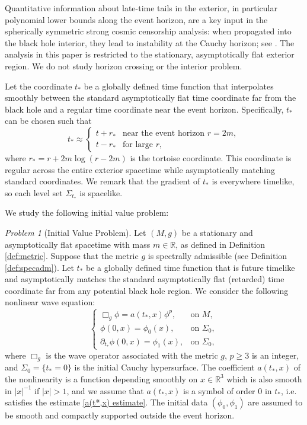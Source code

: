 \documentclass[10pt,a4paper,reqno]{amsart}
\newcommand{\RR}{\mathbb{R}}
\theoremstyle{definition}
\theoremstyle{remark}
\newtheorem{problem}[theorem]{Problem}
\numberwithin{equation}{section}
\newcommand{\R}{\mathbb R}
\newcommand{\ts}{t_*}
\begin{document}
Quantitative information about late-time tails in the exterior, in particular polynomial lower bounds along the event horizon, are a key input in the spherically symmetric strong cosmic censorship analysis: when propagated into the black hole interior, they lead to instability at the Cauchy horizon; see \cite{Luk2019a,Luk2019b}. The analysis in this paper is restricted to the stationary, asymptotically flat exterior region. We do not study horizon crossing or the interior problem.

Let the coordinate $t_*$ be a globally defined time function that interpolates smoothly between the standard asymptotically flat time coordinate far from the black hole and a regular time coordinate near the event horizon. Specifically, $t_*$ can be chosen such that
\[
t_* \approx 
\begin{cases}
t + r_* & \text{near the event horizon } r = 2m, \\
t - r_* & \text{for large } r,
\end{cases}
\]
where $r_* = r + 2m \log(r - 2m)$ is the tortoise coordinate. This coordinate is regular across the entire exterior spacetime while asymptotically matching standard coordinates. We remark that the gradient of $t_*$ is everywhere timelike, so each level set $\Sigma_{t_*}$ is spacelike.

\medskip

We study the following initial value problem:

\begin{problem}[Initial Value Problem]
Let $(M, g)$ be a stationary and asymptotically flat spacetime with mass $m \in \R$, as defined in Definition \ref{def:metric}. Suppose that the metric $g$ is spectrally admissible (see Definition \ref{def:specadm}). Let $t_*$ be a globally defined time function that is future timelike and asymptotically matches the standard asymptotically flat (retarded) time coordinate far from any potential black hole region. We consider the following nonlinear wave equation:
\begin{equation}
\label{IVP intro}
\begin{cases}
\Box_g \phi = a(t_*,x) \phi^p, & \text{on } M, \\
\phi(0, x) = \phi_0(x), & \text{on } \Sigma_0, \\
\partial_{t_*}\phi(0, x) = \phi_1(x), & \text{on } \Sigma_0,
\end{cases}
\end{equation}
where $\Box_g$ is the wave operator associated with the metric $g$, $p \geq 3$ is an integer, and $\Sigma_0 = \{t_* = 0\}$ is the initial Cauchy hypersurface. The coefficient $a(\ts,x)$ of the nonlinearity is a function depending smoothly on $x\in \RR^3$ which is also smooth in $|x|^{-1}$ if $|x|>1$, and we assume that $a(\ts,x)$ is a symbol of order $0$ in $\ts$, i.e. satisfies the estimate \eqref{a(t*,x) estimate}. The initial data $(\phi_0, \phi_1)$ are assumed to be smooth and compactly supported outside the event horizon. 
\end{problem}
\end{document}
